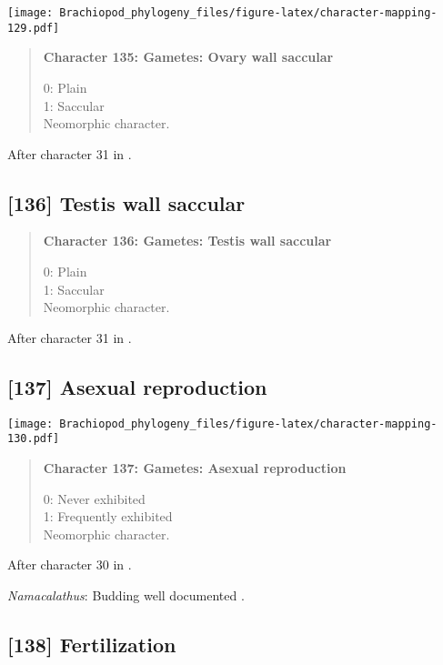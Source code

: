 \documentclass[openany]{book}
\theoremstyle{definition}
\theoremstyle{definition}
\theoremstyle{definition}
\theoremstyle{remark}
\begin{document}
\texttt{[image: Brachiopod\_phylogeny\_files/figure-latex/character-mapping-129.pdf]}

\begin{quote}
\textbf{Character 135: Gametes: Ovary wall saccular}

0: Plain\\
1: Saccular\\
Neomorphic character.
\end{quote}

After character 31 in \citet{Haszprunar1996}.

\subsection*{{[}136{]} Testis wall saccular}\label{testis-wall-saccular}

\begin{quote}
\textbf{Character 136: Gametes: Testis wall saccular}

0: Plain\\
1: Saccular\\
Neomorphic character.
\end{quote}

After character 31 in \citet{Haszprunar1996}.

\subsection*{{[}137{]} Asexual reproduction}\label{asexual-reproduction}

\texttt{[image: Brachiopod\_phylogeny\_files/figure-latex/character-mapping-130.pdf]}

\begin{quote}
\textbf{Character 137: Gametes: Asexual reproduction}

0: Never exhibited\\
1: Frequently exhibited\\
Neomorphic character.
\end{quote}

After character 30 in \citet{Haszprunar1996}.

\hypertarget{Namacalathus-coding-137}{}
\emph{Namacalathus}: Budding well documented
\citep[e.g.][]{Zhuravlev2015Ediacaranskeletal}.

\subsection*{{[}138{]} Fertilization}\label{fertilization}
\end{document}
